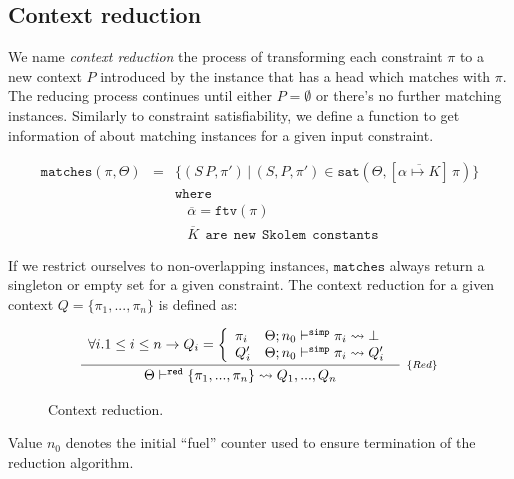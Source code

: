 \documentclass[a4paper, 11pt]{article}
\begin{document}
\subsection{Context reduction} 

We name \emph{context reduction} the process of transforming 
each constraint $\pi$ to a new context $P$ introduced 
by the instance that has a head which matches with 
$\pi$. The reducing process continues until either $P = \emptyset$ 
or there's no further matching instances. Similarly to 
constraint satisfiability, we define a function to 
get information of about matching instances for a given 
input constraint.

\[
  \begin{array}{lcl}
    \mathtt{matches}(\pi,\Theta) & = &\{(S\,P,\pi')\,|\,(S,P,\pi') \in \mathtt{sat}(\Theta,[\overline{\alpha\mapsto K}]\,\pi)\}\\
                          &   &\mathtt{where} \\ 
                          &   &\:\:\:\:\overline{\alpha} = \mathtt{ftv}(\pi)\\
                          &   &\:\:\:\:\overline{K}\:\:\mathtt{are}\:\:\mathtt{new}\:\:\mathtt{Skolem}\:\:\mathtt{constants}
  \end{array}
\]

If we restrict ourselves to non-overlapping instances, 
$\mathtt{matches}$ always return a singleton or empty set for 
a given constraint. The context reduction for a given context
$Q = \{\pi_1,...,\pi_n\}$ is defined as: 

\begin{figure}[H] 
  \[
    \begin{array}{c}
      \infer[_{\{Red\}}]
            {\Theta \reduce \{\pi_1,...,\pi_n\} \leadsto Q_1,..., Q_n}
            {\begin{array}{l}
              \forall i. 1 \leq i \leq n \to Q_i = \left\{
                    \begin{array}{ll}
                      \pi_i & \Theta ; n_0\simp \pi_i \leadsto \bot \\
                      Q'_i & \Theta ; n_0 \simp \pi_i \leadsto Q'_i  
                    \end{array} 
                    \right. 
             \end{array}}
    \end{array}
  \]
  \centering 
  \caption{Context reduction.}
  \label{fig:context-reduction}
\end{figure}
Value $n_0$ denotes the initial ``fuel'' counter used to 
ensure termination of the reduction algorithm.
\end{document}
